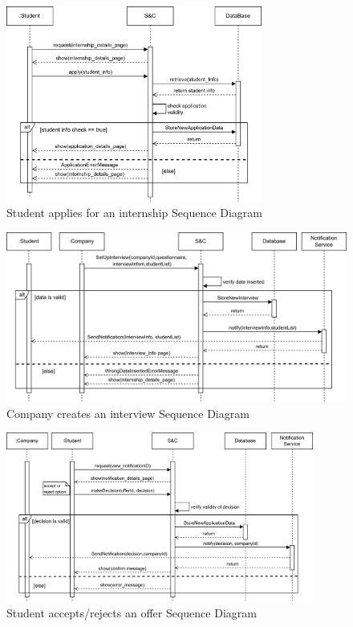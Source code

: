 \begin{figure}[H]
    \centering
    \includegraphics[width=0.75\textwidth]{Images/Sequence_Diagrams/applyInt_SD.png}
    \caption{Student applies for an internship Sequence Diagram}
\end{figure}
\begin{figure}[H]
    \centering
    \includegraphics[width=1\textwidth]{Images/Sequence_Diagrams/createIntvw_SD.png}
    \caption{Company creates an interview Sequence Diagram}
\end{figure}
\begin{figure}[H]
    \centering
    \includegraphics[width=0.9\textwidth]{Images/Sequence_Diagrams/acceptRej_SD.png}
    \caption{Student accepts/rejects an offer Sequence Diagram}
\end{figure}
